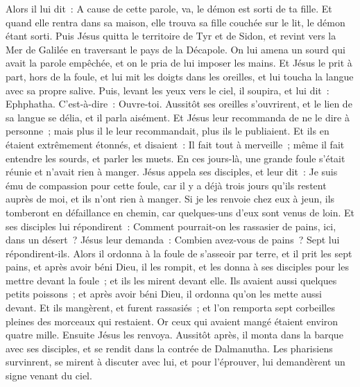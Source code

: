 \begin{multicols}{2}
Alors il lui dit~: A cause de cette parole, va, le démon est sorti de ta fille.
Et quand elle rentra dans sa maison, elle trouva sa fille couchée sur le lit, le démon étant sorti.
Puis Jésus quitta le territoire de Tyr et de Sidon, et revint vers la Mer de Galilée en traversant le pays de la Décapole.
On lui amena un sourd qui avait la parole empêchée, et on le pria de lui imposer les mains.
Et Jésus le prit à part, hors de la foule, et lui mit les doigts dans les oreilles, et lui toucha la langue avec sa propre salive.
Puis, levant les yeux vers le ciel, il soupira, et lui dit~: Ephphatha. C'est-à-dire~: Ouvre-toi.
Aussitôt ses oreilles s'ouvrirent, et le lien de sa langue se délia, et il parla aisément.
Et Jésus leur recommanda de ne le dire à personne~; mais plus il le leur recommandait, plus ils le publiaient.
Et ils en étaient extrêmement étonnés, et disaient~: Il fait tout à merveille~; même il fait entendre les sourds, et parler les muets.
\VerseOne{}En ces jours-là, une grande foule s'était réunie et n'avait rien à manger. Jésus appela ses disciples, et leur dit~:
Je suis ému de compassion pour cette foule, car il y a déjà trois jours qu'ils restent auprès de moi, et ils n'ont rien à manger.
Si je les renvoie chez eux à jeun, ils tomberont en défaillance en chemin, car quelques-uns d'eux sont venus de loin.
Et ses disciples lui répondirent~: Comment pourrait-on les rassasier de pains, ici, dans un désert~?
Jésus leur demanda~: Combien avez-vous de pains~? Sept lui répondirent-ils.
Alors il ordonna à la foule de s'asseoir par terre, et il prit les sept pains, et après avoir béni Dieu, il les rompit, et les donna à ses disciples pour les mettre devant la foule~; et ils les mirent devant elle.
Ils avaient aussi quelques petits poissons~; et après avoir béni Dieu, il ordonna qu'on les mette aussi devant.
Et ils mangèrent, et furent rassasiés~; et l'on remporta sept corbeilles pleines des morceaux qui restaient.
Or ceux qui avaient mangé étaient environ quatre mille. Ensuite Jésus les renvoya.
Aussitôt après, il monta dans la barque avec ses disciples, et se rendit dans la contrée de Dalmanutha.
Les pharisiens survinrent, se mirent à discuter avec lui, et pour l'éprouver, lui demandèrent un signe venant du ciel.

\end{multicols}
